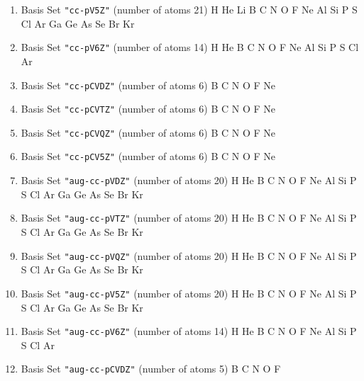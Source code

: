 \begin{enumerate}
\item Basis Set \verb#"cc-pV5Z"# (number of atoms 21)  \newline 
  H He Li B C N O F Ne Al Si P S Cl Ar Ga Ge As Se Br Kr


\item Basis Set \verb#"cc-pV6Z"# (number of atoms 14)  \newline 
  H He B C N O F Ne Al Si P S Cl Ar


\item Basis Set \verb#"cc-pCVDZ"# (number of atoms 6)  \newline 
  B C N O F Ne


\item Basis Set \verb#"cc-pCVTZ"# (number of atoms 6)  \newline 
  B C N O F Ne


\item Basis Set \verb#"cc-pCVQZ"# (number of atoms 6)  \newline 
  B C N O F Ne


\item Basis Set \verb#"cc-pCV5Z"# (number of atoms 6)  \newline 
  B C N O F Ne


\item Basis Set \verb#"aug-cc-pVDZ"# (number of atoms 20)  \newline 
  H He B C N O F Ne Al Si P S Cl Ar Ga Ge As Se Br Kr


\item Basis Set \verb#"aug-cc-pVTZ"# (number of atoms 20)  \newline 
  H He B C N O F Ne Al Si P S Cl Ar Ga Ge As Se Br Kr


\item Basis Set \verb#"aug-cc-pVQZ"# (number of atoms 20)  \newline 
  H He B C N O F Ne Al Si P S Cl Ar Ga Ge As Se Br Kr


\item Basis Set \verb#"aug-cc-pV5Z"# (number of atoms 20)  \newline 
  H He B C N O F Ne Al Si P S Cl Ar Ga Ge As Se Br Kr


\item Basis Set \verb#"aug-cc-pV6Z"# (number of atoms 14)  \newline 
  H He B C N O F Ne Al Si P S Cl Ar


\item Basis Set \verb#"aug-cc-pCVDZ"# (number of atoms 5)  \newline 
  B C N O F



\end{enumerate}
